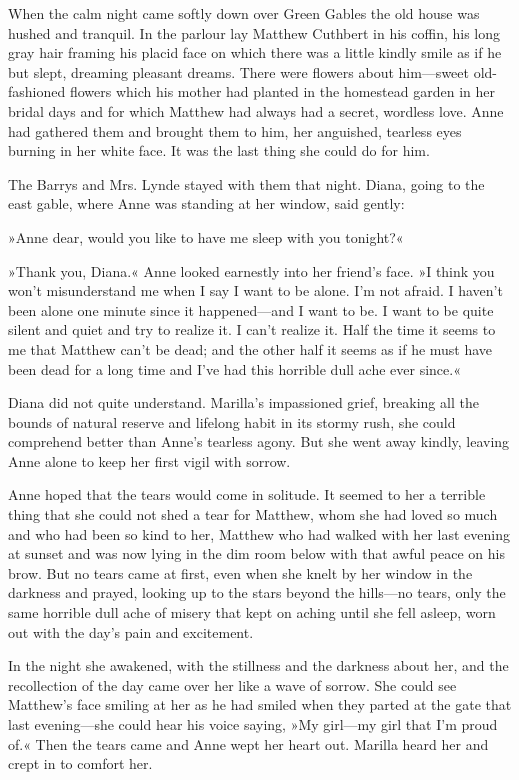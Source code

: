 When the calm night came softly down over Green Gables the old house was hushed and tranquil. In the parlour lay Matthew Cuthbert in his coffin, his long gray hair framing his placid face on which there was a little kindly smile as if he but slept, dreaming pleasant dreams. There were flowers about him—sweet old-fashioned flowers which his mother had planted in the homestead garden in her bridal days and for which Matthew had always had a secret, wordless love. Anne had gathered them and brought them to him, her anguished, tearless eyes burning in her white face. It was the last thing she could do for him.

The Barrys and Mrs. Lynde stayed with them that night. Diana, going to the east gable, where Anne was standing at her window, said gently:

»Anne dear, would you like to have me sleep with you tonight?«

»Thank you, Diana.« Anne looked earnestly into her friend's face. »I think you won't misunderstand me when I say I want to be alone. I'm not afraid. I haven't been alone one minute since it happened—and I want to be. I want to be quite silent and quiet and try to realize it. I can't realize it. Half the time it seems to me that Matthew can't be dead; and the other half it seems as if he must have been dead for a long time and I've had this horrible dull ache ever since.«

Diana did not quite understand. Marilla's impassioned grief, breaking all the bounds of natural reserve and lifelong habit in its stormy rush, she could comprehend better than Anne's tearless agony. But she went away kindly, leaving Anne alone to keep her first vigil with sorrow.

Anne hoped that the tears would come in solitude. It seemed to her a terrible thing that she could not shed a tear for Matthew, whom she had loved so much and who had been so kind to her, Matthew who had walked with her last evening at sunset and was now lying in the dim room below with that awful peace on his brow. But no tears came at first, even when she knelt by her window in the darkness and prayed, looking up to the stars beyond the hills—no tears, only the same horrible dull ache of misery that kept on aching until she fell asleep, worn out with the day's pain and excitement.

In the night she awakened, with the stillness and the darkness about her, and the recollection of the day came over her like a wave of sorrow. She could see Matthew's face smiling at her as he had smiled when they parted at the gate that last evening—she could hear his voice saying, »My girl—my girl that I'm proud of.« Then the tears came and Anne wept her heart out. Marilla heard her and crept in to comfort her.

